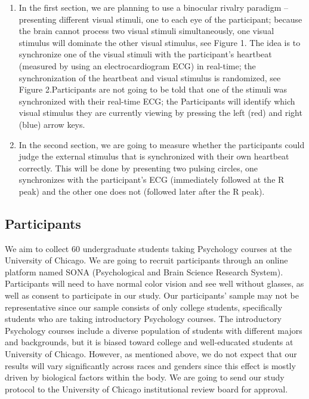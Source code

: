 \documentclass[
  man]{apa6}
\begin{document}
\begin{enumerate}
\def\labelenumi{\arabic{enumi}.}
\item
  In the first section, we are planning to use a binocular rivalry paradigm -- presenting different visual stimuli, one to each eye of the participant; because the brain cannot process two visual stimuli simultaneously, one visual stimulus will dominate the other visual stimulus, see Figure 1. The idea is to synchronize one of the visual stimuli with the participant's heartbeat (measured by using an electrocardiogram ECG) in real-time; the synchronization of the heartbeat and visual stimulus is randomized, see Figure 2.Participants are not going to be told that one of the stimuli was synchronized with their real-time ECG; the Participants will identify which visual stimulus they are currently viewing by pressing the left (red) and right (blue) arrow keys.
\item
  In the second section, we are going to measure whether the participants could judge the external stimulus that is synchronized with their own heartbeat correctly. This will be done by presenting two pulsing circles, one synchronizes with the participant's ECG (immediately followed at the R peak) and the other one does not (followed later after the R peak).
\end{enumerate}

\hypertarget{participants}{%
\subsection{Participants}\label{participants}}

We aim to collect 60 undergraduate students taking Psychology courses at the University of Chicago. We are going to recruit participants through an online platform named SONA (Psychological and Brain Science Research System). Participants will need to have normal color vision and see well without glasses, as well as consent to participate in our study. Our participants' sample may not be representative since our sample consists of only college students, specifically students who are taking introductory Psychology courses. The introductory Psychology courses include a diverse population of students with different majors and backgrounds, but it is biased toward college and well-educated students at University of Chicago. However, as mentioned above, we do not expect that our results will vary significantly across races and genders since this effect is mostly driven by biological factors within the body. We are going to send our study protocol to the University of Chicago institutional review board for approval.
\end{document}
